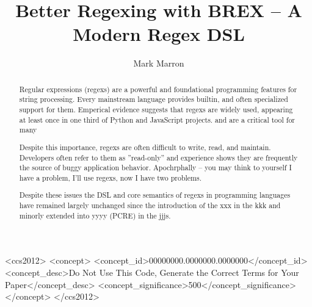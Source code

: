 \documentclass[acmsmall,review,anonymous]{acmart}
\begin{document}
\title{Better Regexing with BREX -- A Modern Regex DSL}

\author{Mark Marron}

\begin{abstract}
Regular expressions (regexs) are a powerful and foundational programming features for string processing. Every mainstream language provides 
builtin, and often specialized support for them. Emperical evidence suggests that regexs are widely used, appearing at least once in 
one third of Python and JavaScript projects.  and are a critical tool for many

Despite this importance, regexs are often difficult to write, read, and maintain. Developers often refer to them as ''read-only'' and 
experience shows they are frequently the source of buggy application behavior. 
Apochrphally -- you may think to yourself I have a problem, I'll use regexs, now I have two problems. 

Despite these issues the DSL and core semantics of regexs in programming languages have remained largely unchanged since the 
introduction of the xxx in the kkk and minorly extended into yyyy (PCRE) in the jjjs.
\end{abstract}

\begin{CCSXML}
<ccs2012>
 <concept>
  <concept_id>00000000.0000000.0000000</concept_id>
  <concept_desc>Do Not Use This Code, Generate the Correct Terms for Your Paper</concept_desc>
  <concept_significance>500</concept_significance>
 </concept>
</ccs2012>
\end{CCSXML}




\maketitle
\end{document}
